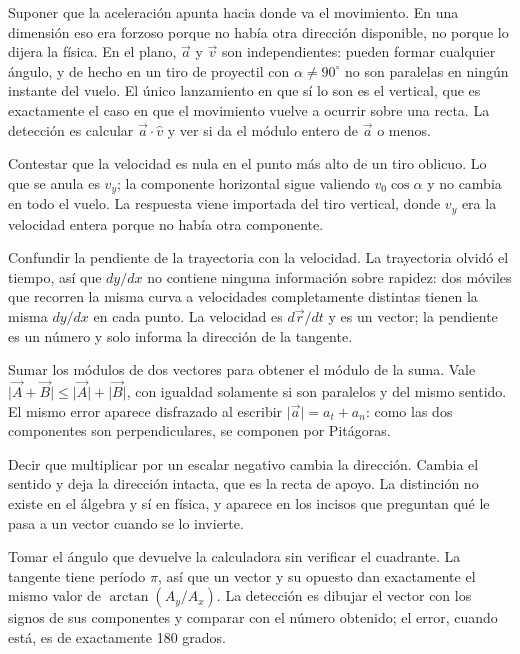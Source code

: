 \documentclass[11pt,openany]{book}
\begin{document}
\begin{erroresComunes}
  \item Suponer que la aceleración apunta hacia donde va el movimiento. En una dimensión eso era forzoso porque no había otra dirección disponible, no porque lo dijera la física. En el plano, $\vec a$ y $\vec v$ son independientes: pueden formar cualquier ángulo, y de hecho en un tiro de proyectil con $\alpha \neq 90^\circ$ no son paralelas en ningún instante del vuelo. El único lanzamiento en que sí lo son es el vertical, que es exactamente el caso en que el movimiento vuelve a ocurrir sobre una recta. La detección es calcular $\vec a\cdot\hat v$ y ver si da el módulo entero de $\vec a$ o menos.
  \item Contestar que la velocidad es nula en el punto más alto de un tiro oblicuo. Lo que se anula es $v_y$; la componente horizontal sigue valiendo $v_0\cos\alpha$ y no cambia en todo el vuelo. La respuesta viene importada del tiro vertical, donde $v_y$ era la velocidad entera porque no había otra componente.
  \item Confundir la pendiente de la trayectoria con la velocidad. La trayectoria olvidó el tiempo, así que $dy/dx$ no contiene ninguna información sobre rapidez: dos móviles que recorren la misma curva a velocidades completamente distintas tienen la misma $dy/dx$ en cada punto. La velocidad es $d\vec r/dt$ y es un vector; la pendiente es un número y solo informa la dirección de la tangente.
  \item Sumar los módulos de dos vectores para obtener el módulo de la suma. Vale $\lvert\vec A + \vec B\rvert \leq \lvert\vec A\rvert + \lvert\vec B\rvert$, con igualdad solamente si son paralelos y del mismo sentido. El mismo error aparece disfrazado al escribir $\lvert\vec a\rvert = a_t + a_n$: como las dos componentes son perpendiculares, se componen por Pitágoras.
  \item Decir que multiplicar por un escalar negativo cambia la dirección. Cambia el sentido y deja la dirección intacta, que es la recta de apoyo. La distinción no existe en el álgebra y sí en física, y aparece en los incisos que preguntan qué le pasa a un vector cuando se lo invierte.
  \item Tomar el ángulo que devuelve la calculadora sin verificar el cuadrante. La tangente tiene período $\pi$, así que un vector y su opuesto dan exactamente el mismo valor de $\arctan(A_y/A_x)$. La detección es dibujar el vector con los signos de sus componentes y comparar con el número obtenido; el error, cuando está, es de exactamente 180 grados.

\end{erroresComunes}
\end{document}
